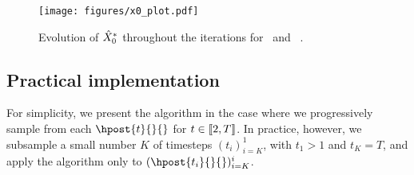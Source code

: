 \begin{figure} 
    \centering
    \texttt{[image: figures/x0\_plot.pdf]}
    \captionsetup{font=small}
    \caption{Evolution of $\hat{X}^* _0$ throughout the iterations for \algo\ and \daps\ \cite{zhang2024daps}. }
    \label{fig:running_x0}
\end{figure}
\label{sec:implementation}
\subsection{Practical implementation}
For simplicity, we present the algorithm in the case where we progressively sample from each $\hpost{t}{}{}$ for $t \in \llbracket 2, T \rrbracket$. In practice, however, we subsample a small number $K$ of timesteps $(t_i)_{i = K}^1$, with $t_1 > 1$ and $t_K = T$, and apply the algorithm only to $( \hpost{t_i}{}{} )_{i = K}^i$. 


